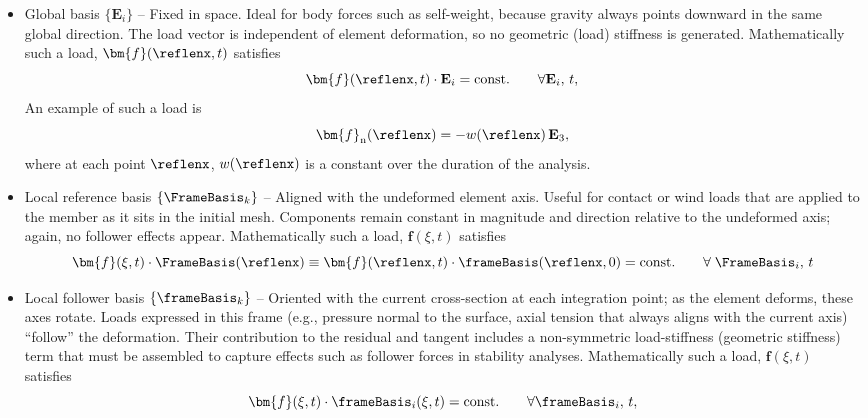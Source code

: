 \begin{itemize}
\item Global basis \(\{\mathbf{E}_{i}\}\) – Fixed in space.  
Ideal for body forces such as self-weight, because gravity always points downward in the same global direction.  The load vector is independent of element deformation, so no geometric (load) stiffness is generated. Mathematically such a load, \(\bm{f}(\reflenx,t)\) satisfies
\begin{equation*}
    \bm{f}(\reflenx,t) \cdot \mathbf{E}_i = \mathrm{const.}
    \qquad\forall \mathbf{E}_i,\, t,
\end{equation*}
An example of such a load is 
\begin{equation*}
    \bm{f}_{\mathrm{n}}(\reflenx) = -w(\reflenx) \, \mathbf{E}_3,
\end{equation*}
where at each point \(\reflenx\), \(w(\reflenx)\) is a constant over the duration of the analysis.

\item Local reference basis \(\{\FrameBasis_k\}\) – Aligned with the undeformed element axis.  Useful for contact or wind loads that are applied to the member as it sits in the initial mesh.  Components remain constant in magnitude and direction relative to the undeformed axis; again, no follower effects appear.
Mathematically such a load, \(\bm{f}(\xi,t)\) satisfies
\begin{equation*}
    \bm{f}(\xi,t) \cdot \FrameBasis(\reflenx)  \equiv \bm{f}(\reflenx,t) \cdot \frameBasis(\reflenx,0) = \mathrm{const.}
    \qquad\forall\; \FrameBasis_i,\, t
\end{equation*}

\item Local follower basis \(\{\frameBasis_k\}\) – Oriented with the current cross-section at each integration point; as the element deforms, these axes rotate.  Loads expressed in this frame (e.g., pressure normal to the surface, axial tension that always aligns with the current axis) “follow” the deformation.  
Their contribution to the residual and tangent includes a non-symmetric load-stiffness (geometric stiffness) term that must be assembled to capture effects such as follower forces in stability analyses.
Mathematically such a load, \(\bm{f}(\xi,t)\) satisfies
\begin{equation*}
    \bm{f}(\xi,t) \cdot \frameBasis_i(\xi,t) = \mathrm{const.}
    \qquad\forall \frameBasis_i,\, t,
\end{equation*}
\end{itemize}

